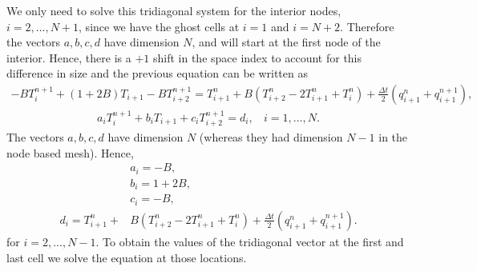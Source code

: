 We only need to solve this tridiagonal system for the interior nodes, $i=2,...,N+1$, since we have the ghost cells at $i = 1$ and $i = N + 2$. Therefore the vectors $a, b, c, d$ have dimension $N$, and will start at the first node of the interior. Hence, there is a $+1$ shift in the space index to account for this difference in size and the previous equation can be written as
\begin{align*}
-BT_{i}^{n+1}+(1+2B)T_{i+1}-BT_{i+2}^{n+1}=T_{i+1}^n+B\left(T_{i+2}^n-2T_{i+1}^n+T_{i}^n\right)+\frac{\Delta t}{2}\left(q_{i+1}^n+q_{i+1}^{n+1}\right),
\end{align*}
\begin{align*}
a_iT_{i}^{n+1}+b_iT_{i+1}+c_iT_{i+2}^{n+1}=d_i,~~~~i=1,...,N.
\end{align*}
The vectors $a,b,c,d$ have dimension $N$ (whereas they had dimension $N-1$ in the node based mesh). Hence,
\begin{align*}
&a_i=-B,\\
&b_i=1+2B,\\
&c_i=-B,\\
d_i=T_{i+1}^n+&B\left(T_{i+2}^n-2T_{i+1}^n+T_{i}^n\right)+\frac{\Delta t}{2}\left(q_{i+1}^n+q_{i+1}^{n+1}\right).
\end{align*}
for $i=2,...,N-1$. To obtain the values of the tridiagonal vector at the first and last cell we solve the equation at those locations.

